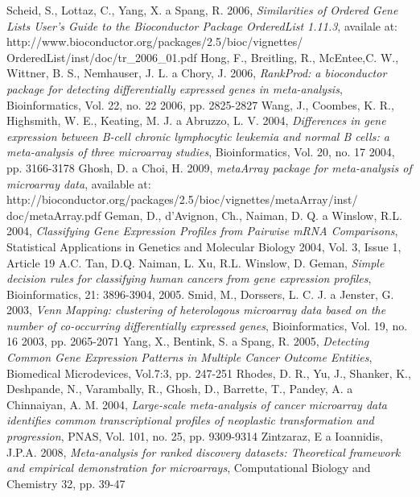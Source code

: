 \documentclass[a4paper]{report}
\begin{document}
\begin{thebibliography}{99}
Scheid, S., Lottaz, C., Yang, X. a Spang, R. 2006, \emph{Similarities of Ordered Gene Lists User's Guide to the Bioconductor Package OrderedList 1.11.3}, availale at: http://www.bioconductor.org/packages/2.5/bioc/vignettes/
OrderedList/inst/doc/tr\_2006\_01.pdf
Hong, F., Breitling, R., McEntee,C. W., Wittner, B. S., Nemhauser, J. L. a Chory, J. 2006, \emph{RankProd: a bioconductor package for detecting differentially expressed genes in meta-analysis}, Bioinformatics, Vol. 22, no. 22 2006, pp. 2825-2827
Wang, J., Coombes, K. R., Highsmith, W. E., Keating, M. J. a  Abruzzo, L. V. 2004, \emph{Differences in gene expression between B-cell chronic lymphocytic leukemia and normal B cells: a meta-analysis of three microarray studies}, Bioinformatics, Vol. 20, no. 17 2004, pp. 3166-3178
 Ghosh, D. a Choi, H. 2009, \emph{metaArray package for meta-analysis of microarray data}, available at: http://bioconductor.org/packages/2.5/bioc/vignettes/metaArray/inst/ doc/metaArray.pdf
Geman, D., d'Avignon, Ch., Naiman, D. Q. a Winslow, R.L. 2004, \emph{Classifying Gene Expression Profiles from Pairwise mRNA Comparisons}, Statistical Applications in Genetics and Molecular Biology 2004, Vol. 3, Issue 1, Article 19
 A.C. Tan, D.Q. Naiman, L. Xu, R.L. Winslow, D. Geman, \emph{Simple decision rules for classifying human cancers from gene expression profiles}, Bioinformatics, 21: 3896-3904, 2005.
Smid, M., Dorssers, L. C. J. a Jenster, G. 2003, \emph{Venn Mapping: clustering of heterologous microarray data based on the number of co-occurring differentially expressed genes}, Bioinformatics, Vol. 19, no. 16 2003, pp. 2065-2071
Yang, X., Bentink, S. a Spang, R. 2005, \emph{Detecting Common Gene Expression Patterns in Multiple Cancer Outcome Entities}, Biomedical Microdevices, Vol.7:3, pp. 247-251
Rhodes, D. R., Yu, J., Shanker, K., Deshpande, N., Varambally, R., Ghosh, D., Barrette, T., Pandey, A. a Chinnaiyan, A. M. 2004, \emph{Large-scale meta-analysis of cancer microarray data identifies common transcriptional profiles of neoplastic transformation and progression}, PNAS, Vol. 101, no. 25, pp. 9309-9314
Zintzaraz, E a Ioannidis, J.P.A. 2008, \emph{Meta-analysis for ranked discovery datasets: Theoretical framework and empirical demonstration for microarrays}, Computational Biology and Chemistry 32, pp. 39-47
\end{thebibliography}
\end{document}
